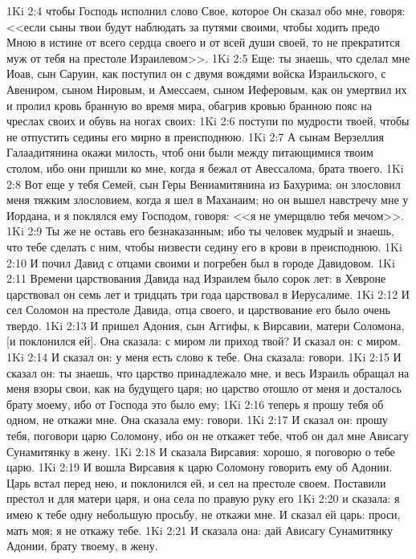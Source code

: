 \vs 1Ki 2:4 чтобы Господь исполнил слово Свое, которое Он сказал обо мне, говоря: <<если сыны твои будут наблюдать за путями своими, чтобы ходить предо Мною в истине от всего сердца своего и от всей души своей, то не прекратится муж от тебя на престоле Израилевом>>.
\vs 1Ki 2:5 Еще: ты знаешь, что сделал мне Иоав, сын Саруин, как поступил он с двумя вождями войска Израильского, с Авениром, сыном Нировым, и Амессаем, сыном Иеферовым, как он умертвил их и пролил кровь бранную во время мира, обагрив кровью бранною пояс на чреслах своих и обувь на ногах своих:
\vs 1Ki 2:6 поступи по мудрости твоей, чтобы не отпустить седины его мирно в преисподнюю.
\vs 1Ki 2:7 А сынам Верзеллия Галаадитянина окажи милость, чтоб они были между питающимися твоим столом, ибо они пришли ко мне, когда я бежал от Авессалома, брата твоего.
\vs 1Ki 2:8 Вот еще у тебя Семей, сын Геры Вениамитянина из Бахурима; он злословил меня тяжким злословием, когда я шел в Маханаим; но он вышел навстречу мне у Иордана, и я поклялся ему Господом, говоря: <<я не умерщвлю тебя мечом>>.
\vs 1Ki 2:9 Ты же не оставь его безнаказанным; ибо ты человек мудрый и знаешь, что тебе сделать с ним, чтобы низвести седину его в крови в преисподнюю.
\vs 1Ki 2:10 И почил Давид с отцами своими и погребен был в городе Давидовом.
\vs 1Ki 2:11 Времени царствования Давида над Израилем было сорок лет: в Хевроне царствовал он семь лет и тридцать три года царствовал в Иерусалиме.
\rsbpar\vs 1Ki 2:12 И сел Соломон на престоле Давида, отца своего, и царствование его было очень твердо.
\vs 1Ki 2:13 И пришел Адония, сын Аггифы, к Вирсавии, матери Соломона, [и поклонился ей]. Она сказала: с миром ли приход твой? И сказал он: с миром.
\vs 1Ki 2:14 И сказал он: у меня есть слово к тебе. Она сказала: говори.
\vs 1Ki 2:15 И сказал он: ты знаешь, что царство принадлежало мне, и весь Израиль обращал на меня взоры свои, как на будущего царя; но царство отошло от меня и досталось брату моему, ибо от Господа это было ему;
\vs 1Ki 2:16 теперь я прошу тебя об одном, не откажи мне. Она сказала ему: говори.
\vs 1Ki 2:17 И сказал он: прошу тебя, поговори царю Соломону, ибо он не откажет тебе, чтоб он дал мне Ависагу Сунамитянку в жену.
\vs 1Ki 2:18 И сказала Вирсавия: хорошо, я поговорю о тебе царю.
\vs 1Ki 2:19 И вошла Вирсавия к царю Соломону говорить ему об Адонии. Царь встал перед нею, и поклонился ей, и сел на престоле своем. Поставили престол и для матери царя, и она села по правую руку его
\vs 1Ki 2:20 и сказала: я имею к тебе одну небольшую просьбу, не откажи мне. И сказал ей царь: проси, мать моя; я не откажу тебе.
\vs 1Ki 2:21 И сказала она: дай Ависагу Сунамитянку Адонии, брату твоему, в жену.
